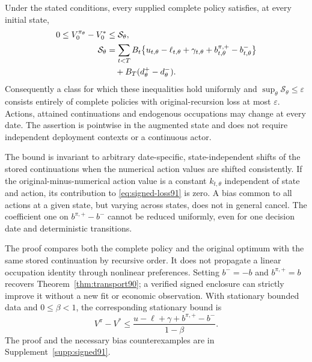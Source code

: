 \begin{theorem}\label{thm:signed91}
Under the stated conditions, every supplied complete policy satisfies, at every initial state,
\begin{align}\label{eq:signed-loss91}
 0\le V_0^{\pi_\theta}-V_0^*
 &\le \mathcal S_\theta,\notag\\
 \mathcal S_\theta
 &=\sum_{t<T}B_t\bigl\{u_{t,\theta}-\ell_{t,\theta}
       +\gamma_{t,\theta}+b^{\pi,+}_{t,\theta}-b^-_{t,\theta}\bigr\}\notag\\
 &\quad+B_T(d^+_\theta-d^-_\theta).
\end{align}
Consequently a class for which these inequalities hold uniformly and $\sup_\theta\mathcal S_\theta\le\varepsilon$ consists entirely of complete policies with original-recursion loss at most $\varepsilon$. Actions, attained continuations and endogenous occupations may change at every date. The assertion is pointwise in the augmented state and does not require independent deployment contexts or a continuous actor.

The bound is invariant to arbitrary date-specific, state-independent shifts of the stored continuations when the numerical action values are shifted consistently. If the original-minus-numerical action value is a constant $k_{t,\theta}$ independent of state and action, its contribution to \eqref{eq:signed-loss91} is zero. A bias common to all actions at a given state, but varying across states, does not in general cancel. The coefficient one on $b^{\pi,+}-b^-$ cannot be reduced uniformly, even for one decision date and deterministic transitions.
\end{theorem}

The proof compares both the complete policy and the original optimum with the same stored continuation by recursive order. It does not propagate a linear occupation identity through nonlinear preferences. Setting $b^-=-b$ and $b^{\pi,+}=b$ recovers Theorem~\ref{thm:transport90}; a verified signed enclosure can strictly improve it without a new fit or economic observation. With stationary bounded data and $0\le\beta<1$, the corresponding stationary bound is
\[
 V^\pi-V^*\le
 \frac{u-\ell+\gamma+b^{\pi,+}-b^-}{1-\beta}.
\]
The proof and the necessary bias counterexamples are in Supplement~\ref{supp:signed91}.


